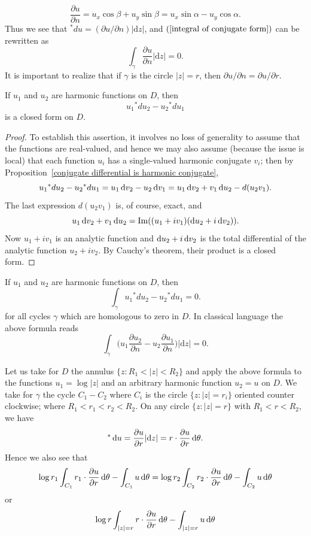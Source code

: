 \[\frac{\partial u}{\partial n}=u_x\cos\beta+u_y\sin\beta=u_x\sin\alpha-u_y\cos\alpha.\]
Thus we see that $^{\ast}du=(\partial u/\partial n)|\mathrm{d}z|$, and $(\ref{integral of conjugate form})$ can be rewritten as
\[\int_{\gamma}\frac{\partial u}{\partial n}|\mathrm{d}z|=0.\]
It is important to realize that if $\gamma$ is the circle $|z|=r$, then $\partial u/\partial n=\partial u/\partial r$.
\begin{theorem}
If $u_1$ and $u_2$ are harmonic functions on $D$, then
\[u_1{^{\ast}du_2}-u_2{^{\ast}du_1}\]
is a closed form on $D$.
\end{theorem}
\begin{proof}
To establish this assertion, it involves no loss of generality to assume that the functions are real-valued, and hence we may also assume (because the issue is local) that each function $u_i$ has a single-valued harmonic conjugate $v_i$; then by Proposition~\ref{conjugate differential is harmonic conjugate},
\[u_1{^{\ast}du_2}-u_2{^{\ast}du_1}=u_1\mathop{}\!\mathrm{d} v_2-u_2\mathop{}\!\mathrm{d} v_1=u_1\mathop{}\!\mathrm{d} v_2+v_1\mathop{}\!\mathrm{d} u_2-d(u_2v_1).\]
The last expression $d(u_2v_1)$ is, of course, exact, and
\[u_1\mathop{}\!\mathrm{d} v_2+v_1\mathop{}\!\mathrm{d} u_2=\operatorname{Im}((u_1+iv_1)(\mathop{}\!\mathrm{d} u_2+i\mathop{}\!\mathrm{d} v_2)).\]
Now $u_1+iv_1$ is an analytic function and $\mathop{}\!\mathrm{d} u_2+i\mathop{}\!\mathrm{d} v_2$ is the total differential of the analytic function $u_2+iv_2$. By Cauchy's theorem, their product is a closed form.
\end{proof}
\begin{corollary}
If $u_1$ and $u_2$ are harmonic functions on $D$, then
\[\int_{\gamma}u_1{^{\ast}du_2}-u_2{^{\ast}du_1}=0.\]
for all cycles $\gamma$ which are homologous to zero in $D$. In classical language the above formula reads
\[\int_{\gamma}\Big(u_1\frac{\partial u_2}{\partial n}-u_2\frac{\partial u_1}{\partial n}\Big)|\mathrm{d}z|=0.\]
\end{corollary}
Let us take for $D$ the annulus $\{z:R_1<|z|<R_2\}$ and apply the above formula to the functions $u_1=\log|z|$ and an arbitrary harmonic function $u_2=u$ on $D$. We take for $\gamma$ the cycle $C_1-C_2$ where $C_i$ is the circle $\{z:|z|=r_i\}$ oriented counter clockwise; where $R_1<r_1<r_2<R_2$. On any circle $\{z:|z|=r\}$ with $R_1<r<R_2$, we have
\[^{\ast}\mathop{}\!\mathrm{d} u=\frac{\partial u}{\partial r}|\mathrm{d}z|=r\cdot\frac{\partial u}{\partial r}\mathop{}\!\mathrm{d}\theta.\]
Hence we also see that
\[\log r_1\int_{C_1}r_1\cdot\frac{\partial u}{\partial r}\mathop{}\!\mathrm{d}\theta-\int_{C_1}u\mathop{}\!\mathrm{d}\theta=\log r_2\int_{C_2}r_2\cdot\frac{\partial u}{\partial r}\mathop{}\!\mathrm{d}\theta-\int_{C_2}u\mathop{}\!\mathrm{d}\theta\]
or
\[\log r\int_{|z|=r}r\cdot\frac{\partial u}{\partial r}\mathop{}\!\mathrm{d}\theta-\int_{|z|=r}u\mathop{}\!\mathrm{d}\theta\]
